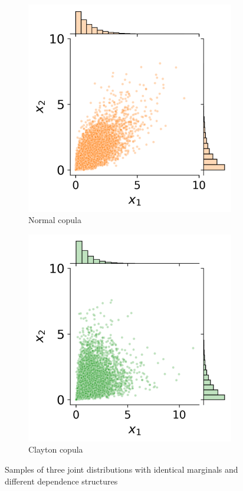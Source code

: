 \begin{figure}[ht]
\begin{subfigure}[b]{0.32\textwidth}
        \includegraphics[width=\textwidth]{../numerical_experiments/chapter1/figures/normal_copula.png}
        \caption{Normal copula}
    \end{subfigure}
    \hfill
    \begin{subfigure}[b]{0.32\textwidth}
        \centering
        \includegraphics[width=\textwidth]{../numerical_experiments/chapter1/figures/clayton_copula.png}
        \caption{Clayton copula}
    \end{subfigure}
       \caption{Samples of three joint distributions with identical marginals and different dependence structures}
       \label{fig:joint_dist_samples}
\end{figure}

